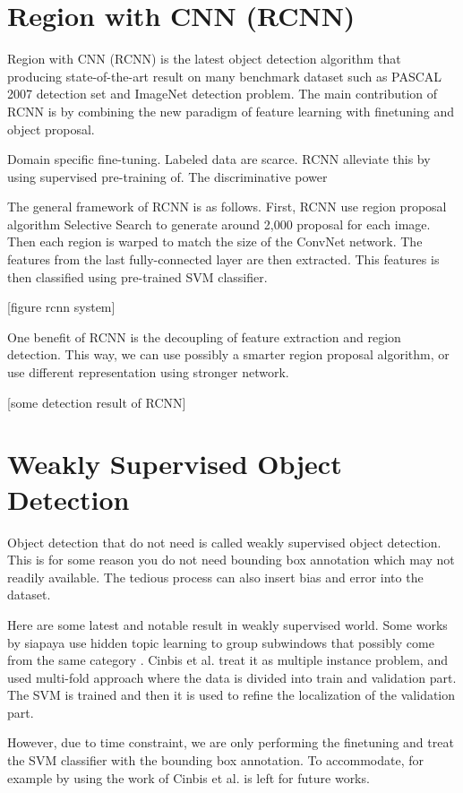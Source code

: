 \documentclass[a4paper,11pt]{kth-mag}
\begin{document}
\section{Region with CNN (RCNN)}
Region with CNN (RCNN) is the latest object detection algorithm that producing state-of-the-art result on many benchmark dataset such as PASCAL 2007 detection set and ImageNet detection problem. The main contribution of RCNN is by combining the new paradigm of feature learning with finetuning and object proposal.

Domain specific fine-tuning.
Labeled data are scarce. RCNN alleviate this by using supervised pre-training of. The discriminative power

The general framework of RCNN is as follows. First, RCNN use region proposal algorithm Selective Search to generate around 2,000 proposal for each image. Then each region is warped to match the size of the ConvNet network. The features from the last fully-connected layer are then extracted. This features is then classified using pre-trained SVM classifier.

[figure rcnn system]

One benefit of RCNN is the decoupling of feature extraction and region detection. This way, we can use possibly a smarter region proposal algorithm, or use different representation using stronger network.

[some detection result of RCNN]

\section{Weakly Supervised Object Detection}
Object detection that do not need is called weakly supervised object detection. This is for some reason you do not need bounding box annotation which may not readily available. The tedious process can also insert bias and error into the dataset. 

Here are some latest and notable result in weakly supervised world.
Some works by siapaya use hidden topic learning to group subwindows that possibly come from the same category \cite{siapaya}.
Cinbis et al. treat it as multiple instance problem, and used multi-fold approach where the data is divided into train and validation part. The SVM is trained and then it is used to refine the localization of the validation part.

However, due to time constraint, we are only performing the finetuning and treat the SVM classifier with the bounding box annotation. To accommodate, for example by using the work of Cinbis et al. \cite{cinbis} is left for future works.
\end{document}
